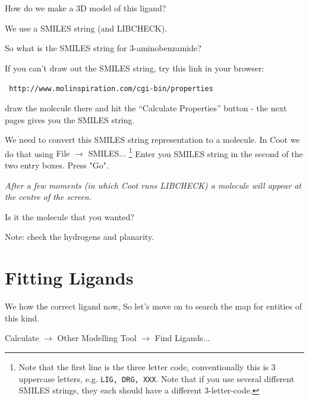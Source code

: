 \documentclass{article}
\begin{document}
\begin{trivlist}
\item  How do we make a 3D model of this ligand?

\textsf{We use a SMILES string (and LIBCHECK).}
\end{trivlist}


\begin{trivlist}
\item So what is the SMILES string for 3-aminobenzamide?
\end{trivlist}


 If you can't draw out the SMILES string, try this link in your browser:

\texttt{ http://www.molinspiration.com/cgi-bin/properties}
\begin{trivlist}
\item  draw the molecule there and hit the ``Calculate Properties'' button - the
 next pages gives you the SMILES string.

\end{trivlist}

We need to convert this SMILES string representation to a molecule.
In Coot we do that using \textsf{File $\rightarrow$ SMILES...}
\footnote{ Note that the first line is the three letter code,
  conventionally this is 3 uppercase letters, e.g. \texttt{LIG, DRG,
    XXX}.  Note that if you use several different SMILES strings, they
  each should have a different 3-letter-code.} Enter you SMILES string
in the second of the two entry boxes. Press "Go".

\textsl{ After a few moments (in which Coot runs LIBCHECK) a molecule
  will appear at the centre of the screen.}

 \begin{trivlist}
 \item Is it the molecule that you wanted?  

 \textsf{Note: check the hydrogens and planarity.}
 \end{trivlist}


\section{Fitting Ligands}

We how the correct ligand now, So let's move on to search the map for
entities of this kind.

 \textsf{Calculate $\rightarrow$ Other Modelling Tool $\rightarrow$ Find Ligands...}
\end{document}
